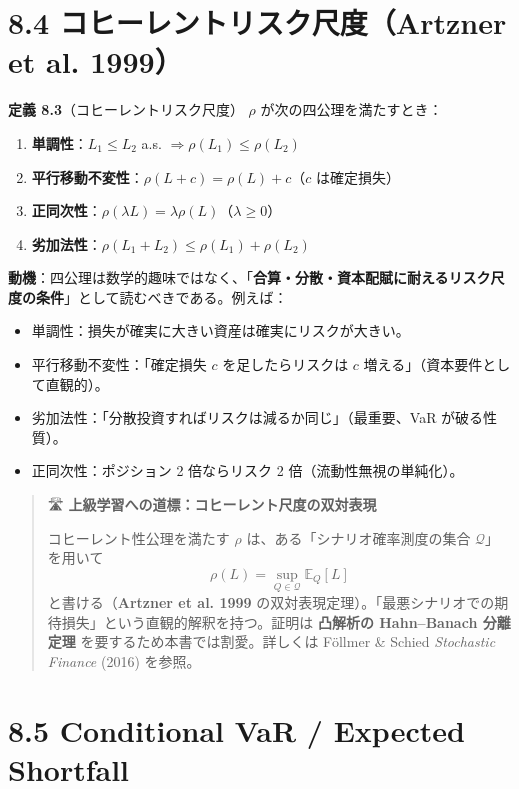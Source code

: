 \documentclass[11pt,a4paper]{report}
\begin{document}
\section{8.4 コヒーレントリスク尺度（Artzner et al. 1999）}

\textbf{定義 8.3}（コヒーレントリスク尺度） $\rho$ が次の四公理を満たすとき：
\begin{enumerate}
\item \textbf{単調性}：$L_1 \le L_2$ a.s. $\Rightarrow \rho(L_1) \le \rho(L_2)$
\item \textbf{平行移動不変性}：$\rho(L + c) = \rho(L) + c$（$c$ は確定損失）
\item \textbf{正同次性}：$\rho(\lambda L) = \lambda \rho(L)$（$\lambda \ge 0$）
\item \textbf{劣加法性}：$\rho(L_1 + L_2) \le \rho(L_1) + \rho(L_2)$
\end{enumerate}

\textbf{動機}：四公理は数学的趣味ではなく、「\textbf{合算・分散・資本配賦に耐えるリスク尺度の条件}」として読むべきである。例えば：
\begin{itemize}
\item 単調性：損失が確実に大きい資産は確実にリスクが大きい。
\item 平行移動不変性：「確定損失 $c$ を足したらリスクは $c$ 増える」（資本要件として直観的）。
\item 劣加法性：「分散投資すればリスクは減るか同じ」（最重要、VaR が破る性質）。
\item 正同次性：ポジション 2 倍ならリスク 2 倍（流動性無視の単純化）。
\end{itemize}

\begin{quote}
🛣 \textbf{上級学習への道標：コヒーレント尺度の双対表現}

コヒーレント性公理を満たす $\rho$ は、ある「シナリオ確率測度の集合 $\mathcal{Q}$」を用いて
\[ \rho(L) = \sup_{Q \in \mathcal{Q}} \mathbb{E}_Q[L] \]
と書ける（\textbf{Artzner et al. 1999} の双対表現定理）。「最悪シナリオでの期待損失」という直観的解釈を持つ。証明は \textbf{凸解析の Hahn–Banach 分離定理} を要するため本書では割愛。詳しくは Föllmer \& Schied \emph{Stochastic Finance} (2016) を参照。
\end{quote}

\section{8.5 Conditional VaR / Expected Shortfall}
\end{document}
